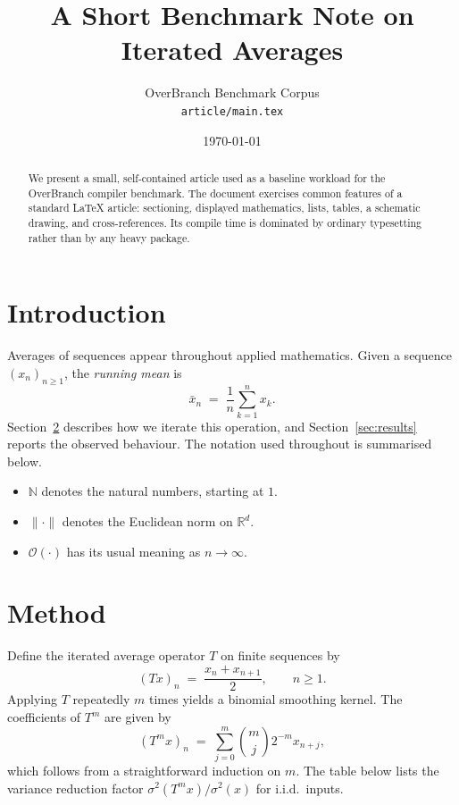 \documentclass[11pt,a4paper]{article}
\title{A Short Benchmark Note on Iterated Averages}
\author{OverBranch Benchmark Corpus\\
  \texttt{article/main.tex}}
\date{\today}
\begin{document}
\maketitle

\begin{abstract}
  We present a small, self-contained article used as a baseline workload for
  the OverBranch compiler benchmark. The document exercises common features of
  a standard \LaTeX{} article: sectioning, displayed mathematics, lists,
  tables, a schematic drawing, and cross-references. Its compile time is
  dominated by ordinary typesetting rather than by any heavy package.
\end{abstract}

\section{Introduction}\label{sec:intro}

Averages of sequences appear throughout applied mathematics. Given a sequence
$(x_n)_{n\ge 1}$, the \emph{running mean} is
\begin{equation}\label{eq:running}
  \bar{x}_n \;=\; \frac{1}{n}\sum_{k=1}^{n} x_k .
\end{equation}
Section~\ref{sec:method} describes how we iterate this operation, and
Section~\ref{sec:results} reports the observed behaviour. The notation used
throughout is summarised below.

\begin{itemize}
  \item $\mathbb{N}$ denotes the natural numbers, starting at $1$.
  \item $\|\cdot\|$ denotes the Euclidean norm on $\mathbb{R}^d$.
  \item $\mathcal{O}(\cdot)$ has its usual meaning as $n\to\infty$.
\end{itemize}

\section{Method}\label{sec:method}

Define the iterated average operator $T$ on finite sequences by
\begin{equation}\label{eq:operator}
  (Tx)_n \;=\; \frac{x_n + x_{n+1}}{2}, \qquad n \ge 1 .
\end{equation}
Applying $T$ repeatedly $m$ times yields a binomial smoothing kernel. The
coefficients of $T^m$ are given by
\begin{equation}\label{eq:binomial}
  (T^m x)_n \;=\; \sum_{j=0}^{m} \binom{m}{j} 2^{-m} x_{n+j},
\end{equation}
which follows from a straightforward induction on $m$. The table below lists
the variance reduction factor $\sigma^2(T^m x)/\sigma^2(x)$ for i.i.d.\ inputs.
\end{document}
